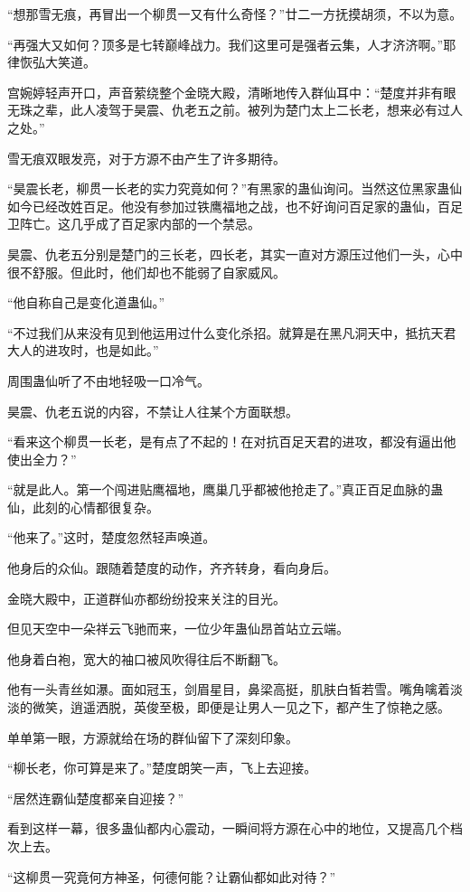 \begin{this_body}
“想那雪无痕，再冒出一个柳贯一又有什么奇怪？”廿二一方抚摸胡须，不以为意。

“再强大又如何？顶多是七转巅峰战力。我们这里可是强者云集，人才济济啊。”耶律恢弘大笑道。

宫婉婷轻声开口，声音萦绕整个金晓大殿，清晰地传入群仙耳中：“楚度并非有眼无珠之辈，此人凌驾于昊震、仇老五之前。被列为楚门太上二长老，想来必有过人之处。”

雪无痕双眼发亮，对于方源不由产生了许多期待。

“昊震长老，柳贯一长老的实力究竟如何？”有黑家的蛊仙询问。当然这位黑家蛊仙如今已经改姓百足。他没有参加过铁鹰福地之战，也不好询问百足家的蛊仙，百足卫阵亡。这几乎成了百足家内部的一个禁忌。

昊震、仇老五分别是楚门的三长老，四长老，其实一直对方源压过他们一头，心中很不舒服。但此时，他们却也不能弱了自家威风。

“他自称自己是变化道蛊仙。”

“不过我们从来没有见到他运用过什么变化杀招。就算是在黑凡洞天中，抵抗天君大人的进攻时，也是如此。”

周围蛊仙听了不由地轻吸一口冷气。

昊震、仇老五说的内容，不禁让人往某个方面联想。

“看来这个柳贯一长老，是有点了不起的！在对抗百足天君的进攻，都没有逼出他使出全力？”

“就是此人。第一个闯进贴鹰福地，鹰巢几乎都被他抢走了。”真正百足血脉的蛊仙，此刻的心情都很复杂。

“他来了。”这时，楚度忽然轻声唤道。

他身后的众仙。跟随着楚度的动作，齐齐转身，看向身后。

金晓大殿中，正道群仙亦都纷纷投来关注的目光。

但见天空中一朵祥云飞驰而来，一位少年蛊仙昂首站立云端。

他身着白袍，宽大的袖口被风吹得往后不断翻飞。

他有一头青丝如瀑。面如冠玉，剑眉星目，鼻梁高挺，肌肤白皙若雪。嘴角噙着淡淡的微笑，逍遥洒脱，英俊至极，即便是让男人一见之下，都产生了惊艳之感。

单单第一眼，方源就给在场的群仙留下了深刻印象。

“柳长老，你可算是来了。”楚度朗笑一声，飞上去迎接。

“居然连霸仙楚度都亲自迎接？”

看到这样一幕，很多蛊仙都内心震动，一瞬间将方源在心中的地位，又提高几个档次上去。

“这柳贯一究竟何方神圣，何德何能？让霸仙都如此对待？”


\end{this_body}
